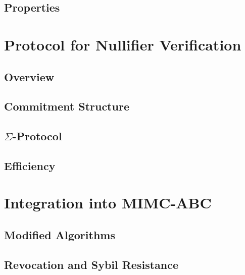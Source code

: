 \subsection{Properties}

\section{Protocol for Nullifier Verification}
\subsection{Overview}

\subsection{Commitment Structure}

\subsection{$\Sigma$-Protocol}


\subsection{Efficiency}






\section{Integration into MIMC-ABC}
\subsection{Modified Algorithms}

\subsection{Revocation and Sybil Resistance}

